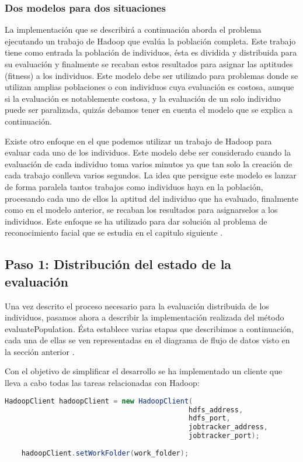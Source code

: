 \subsubsection{Dos modelos para dos situaciones}\label{dos-modelos-para-dos-situaciones}

La implementación que se describirá a continuación aborda el problema ejecutando un trabajo de Hadoop que evalúa la población completa. Este trabajo tiene como entrada la población de individuos, \'esta es dividida y distribuida para su evaluación y finalmente se recaban estos resultados para asignar  las aptitudes (fitness) a los individuos. Este modelo debe ser utilizado para problemas donde se utilizan amplias poblaciones o con individuos cuya evaluación es costosa, aunque si la evaluación es notablemente costosa, y la evaluación de un solo individuo puede ser paralizada, quizás debamos tener en cuenta el modelo que se explica a continuación.

Existe otro enfoque en el que podemos utilizar un trabajo de Hadoop para evaluar cada uno de los individuos. Este modelo debe ser considerado cuando la evaluación de cada individuo toma varios minutos ya que tan solo la creación de cada trabajo conlleva varios segundos. La idea que persigue este modelo es lanzar de forma paralela tantos trabajos como individuos haya en la población, procesando cada uno de ellos la aptitud del individuo que ha evaluado, finalmente como en el modelo anterior, se recaban los resultados para asignarselos a los individuos. Este enfoque se ha utilizado para dar solución al problema de reconocimiento facial que se estudia en el capitulo siguiente .

\subsection{Paso 1: Distribución del estado de la evaluación}

Una vez descrito el proceso necesario para la evaluación distribuida de los individuos, pasamos ahora a describir la implementación realizada del método evaluatePopulation. \'Esta establece varias etapas que describimos a continuación, cada una de ellas se ven representadas en el diagrama de flujo de datos visto en la sección anterior .

Con el objetivo de simplificar el desarrollo se ha implementado un cliente que lleva a cabo todas las tareas relacionadas con Hadoop:

\begin{lstlisting}[language=Java]
	HadoopClient hadoopClient = new HadoopClient(
											hdfs_address,
											hdfs_port,
											jobtracker_address,
											jobtracker_port);
			
	hadoopClient.setWorkFolder(work_folder);
\end{lstlisting}

